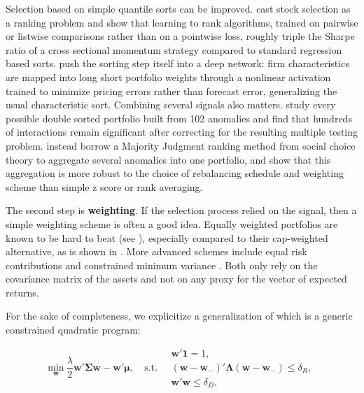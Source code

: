 Selection based on simple quantile sorts can be improved. \cite{poh2020building} cast stock selection as a ranking problem and show that learning to rank algorithms, trained on pairwise or listwise comparisons rather than on a pointwise loss, roughly triple the Sharpe ratio of a cross sectional momentum strategy compared to standard regression based sorts. \cite{feng2019deep} push the sorting step itself into a deep network: firm characteristics are mapped into long short portfolio weights through a nonlinear activation trained to minimize pricing errors rather than forecast error, generalizing the usual characteristic sort. Combining several signals also matters. \cite{muller2021interacting} study every possible double sorted portfolio built from 102 anomalies and find that hundreds of interactions remain significant after correcting for the resulting multiple testing problem. \cite{guidetti2025trust} instead borrow a Majority Judgment ranking method from social choice theory to aggregate several anomalies into one portfolio, and show that this aggregation is more robust to the choice of rebalancing schedule and weighting scheme than simple z score or rank averaging.

The second step is \textbf{weighting}. If the selection process relied on the signal, then a simple weighting scheme is often a good idea. Equally weighted portfolios are known to be hard to beat (see \cite{demiguel2007optimal}), especially compared to their cap-weighted alternative, as is shown in \cite{plyakha2014equal}. More advanced schemes include equal risk contributions \citep{maillard2010properties} and constrained minimum variance \citep{coqueret2015diversified}. Both only rely on the covariance matrix of the assets and not on any proxy for the vector of expected returns.

For the sake of completeness, we explicitize a generalization of \cite{coqueret2015diversified} which is a generic constrained quadratic program:

\begin{equation}
\label{eq:coq}
\underset{\textbf{w}}{\text{min}} \ \frac{\lambda}{2} \textbf{w}'\boldsymbol{\Sigma}\textbf{w}-\textbf{w}'\boldsymbol{\mu} , \quad \text{s.t.} \quad \begin{array}{ll} \textbf{w}'\textbf{1}=1, \\ (\textbf{w}-\textbf{w}_-)'\boldsymbol{\Lambda}(\textbf{w}-\textbf{w}_-) \le \delta_R,\\
\textbf{w}'\textbf{w} \le \delta_D,
\end{array}
\end{equation}

